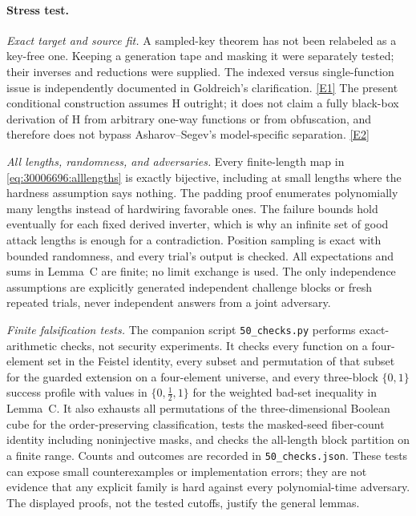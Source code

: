 \documentclass[11pt,a4paper]{article}
\newcommand{\eref}[2]{\hyperlink{extra:#1:#2}{[E#2]}}
\numberwithin{equation}{section}
\begin{document}
\paragraph{Stress test.}
\textit{Exact target and source fit.}
A sampled-key theorem has not been relabeled as a key-free one. Keeping
a generation tape and masking it were separately tested; their inverses
and reductions were supplied. The indexed versus single-function issue
is independently documented in Goldreich's clarification.
\eref{30006696}{1} The present conditional construction assumes H outright;
it does not claim a fully black-box derivation of H from arbitrary
one-way functions or from obfuscation, and therefore does not bypass
Asharov--Segev's model-specific separation. \eref{30006696}{2}

\textit{All lengths, randomness, and adversaries.}
Every finite-length map in \eqref{eq:30006696:alllengths} is exactly bijective,
including at small lengths where the hardness assumption says nothing.
The padding proof enumerates polynomially many lengths instead of
hardwiring favorable ones. The failure bounds hold eventually for each
fixed derived inverter, which is why an infinite set of good attack
lengths is enough for a contradiction. Position sampling is exact with
bounded randomness, and every trial's output is checked. All
expectations and sums in Lemma~C are finite; no limit exchange is used.
The only independence assumptions are explicitly generated independent
challenge blocks or fresh repeated trials, never independent answers
from a joint adversary.

\textit{Finite falsification tests.}
The companion script \texttt{50\_checks.py} performs exact-arithmetic
checks, not security experiments. It checks every function on a
four-element set in the Feistel identity, every subset and permutation
of that subset for the guarded extension on a four-element universe,
and every three-block $\{0,1\}$ success profile with values in
$\{0,\tfrac12,1\}$ for the weighted bad-set inequality in Lemma~C.
It also exhausts all permutations of the three-dimensional Boolean
cube for the order-preserving classification, tests the masked-seed
fiber-count identity including noninjective masks, and checks the
all-length block partition on a finite range. Counts and outcomes are
recorded in \texttt{50\_checks.json}. These tests can expose small
counterexamples or implementation errors; they are not evidence that
any explicit family is hard against every polynomial-time adversary.
The displayed proofs, not the tested cutoffs, justify the general
lemmas.
\end{document}
